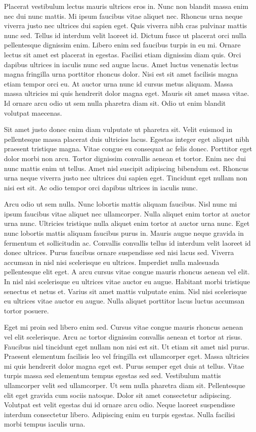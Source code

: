 \documentclass[11pt,a4paper]{article}
\begin{document}
Placerat vestibulum lectus mauris ultrices eros in. Nunc non blandit massa enim nec dui nunc mattis. Mi ipsum faucibus vitae aliquet nec. Rhoncus urna neque viverra justo nec ultrices dui sapien eget. Quis viverra nibh cras pulvinar mattis nunc sed. Tellus id interdum velit laoreet id. Dictum fusce ut placerat orci nulla pellentesque dignissim enim. Libero enim sed faucibus turpis in eu mi. Ornare lectus sit amet est placerat in egestas. Facilisi etiam dignissim diam quis. Orci dapibus ultrices in iaculis nunc sed augue lacus. Amet luctus venenatis lectus magna fringilla urna porttitor rhoncus dolor. Nisi est sit amet facilisis magna etiam tempor orci eu. At auctor urna nunc id cursus metus aliquam. Massa massa ultricies mi quis hendrerit dolor magna eget. Mauris sit amet massa vitae. Id ornare arcu odio ut sem nulla pharetra diam sit. Odio ut enim blandit volutpat maecenas.

Sit amet justo donec enim diam vulputate ut pharetra sit. Velit euismod in pellentesque massa placerat duis ultricies lacus. Egestas integer eget aliquet nibh praesent tristique magna. Vitae congue eu consequat ac felis donec. Porttitor eget dolor morbi non arcu. Tortor dignissim convallis aenean et tortor. Enim nec dui nunc mattis enim ut tellus. Amet nisl suscipit adipiscing bibendum est. Rhoncus urna neque viverra justo nec ultrices dui sapien eget. Tincidunt eget nullam non nisi est sit. Ac odio tempor orci dapibus ultrices in iaculis nunc.

Arcu odio ut sem nulla. Nunc lobortis mattis aliquam faucibus. Nisl nunc mi ipsum faucibus vitae aliquet nec ullamcorper. Nulla aliquet enim tortor at auctor urna nunc. Ultricies tristique nulla aliquet enim tortor at auctor urna nunc. Eget nunc lobortis mattis aliquam faucibus purus in. Mauris augue neque gravida in fermentum et sollicitudin ac. Convallis convallis tellus id interdum velit laoreet id donec ultrices. Purus faucibus ornare suspendisse sed nisi lacus sed. Viverra accumsan in nisl nisi scelerisque eu ultrices. Imperdiet nulla malesuada pellentesque elit eget. A arcu cursus vitae congue mauris rhoncus aenean vel elit. In nisl nisi scelerisque eu ultrices vitae auctor eu augue. Habitant morbi tristique senectus et netus et. Varius sit amet mattis vulputate enim. Nisl nisi scelerisque eu ultrices vitae auctor eu augue. Nulla aliquet porttitor lacus luctus accumsan tortor posuere.

Eget mi proin sed libero enim sed. Cursus vitae congue mauris rhoncus aenean vel elit scelerisque. Arcu ac tortor dignissim convallis aenean et tortor at risus. Faucibus nisl tincidunt eget nullam non nisi est sit. Ut etiam sit amet nisl purus. Praesent elementum facilisis leo vel fringilla est ullamcorper eget. Massa ultricies mi quis hendrerit dolor magna eget est. Purus semper eget duis at tellus. Vitae turpis massa sed elementum tempus egestas sed sed. Vestibulum mattis ullamcorper velit sed ullamcorper. Ut sem nulla pharetra diam sit. Pellentesque elit eget gravida cum sociis natoque. Dolor sit amet consectetur adipiscing. Volutpat est velit egestas dui id ornare arcu odio. Neque laoreet suspendisse interdum consectetur libero. Adipiscing enim eu turpis egestas. Nulla facilisi morbi tempus iaculis urna.
\end{document}
